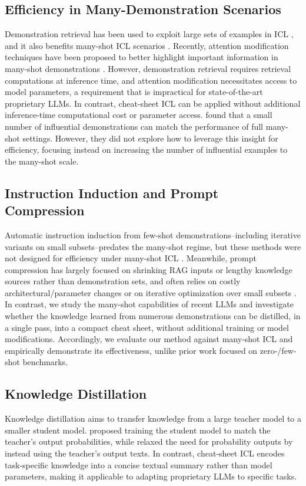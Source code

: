 \documentclass[11pt]{article}
\begin{document}
\subsection{Efficiency in Many-Demonstration Scenarios}
\label{sec:related_efficiency}
Demonstration retrieval has been used to exploit large sets of examples in ICL \citep{liu-etal-2022-makes,luo2024incontext}, and it also benefits many-shot ICL scenarios \citep{bertsch-etal-2025-context}.
Recently, attention modification techniques have been proposed to better highlight important information in many-shot demonstrations \citep{yuan-etal-2024-focused}.
However, demonstration retrieval requires retrieval computations at inference time, and attention modification necessitates access to model parameters, a requirement that is impractical for state-of-the-art proprietary LLMs.
In contrast, cheat-sheet ICL can be applied without additional inference-time computational cost or parameter access.
\citet{wan2025from} found that a small number of influential demonstrations can match the performance of full many-shot settings.
However, they did not explore how to leverage this insight for efficiency, focusing instead on increasing the number of influential examples to the many-shot scale.

\subsection{Instruction Induction and Prompt Compression}
\label{sec:related_inst}
Automatic instruction induction from few-shot demonstrations--including iterative variants on small subsets--predates the many-shot regime, but these methods were not designed for efficiency under many-shot ICL \citep{honovich-etal-2023-instruction,zhou2023large}.
Meanwhile, prompt compression has largely focused on shrinking RAG inputs or lengthy knowledge sources rather than demonstration sets, and often relies on costly architectural/parameter changes or on iterative optimization over small subsets \citep{li-etal-2025-prompt}.
In contrast, we study the many-shot capabilities of recent LLMs and investigate whether the knowledge learned from numerous demonstrations can be distilled, in a single pass, into a compact cheat sheet, without additional training or model modifications.
Accordingly, we evaluate our method against many-shot ICL and empirically demonstrate its effectiveness, unlike prior work focused on zero-/few-shot benchmarks.


\subsection{Knowledge Distillation}
\label{sec:distill}
Knowledge distillation aims to transfer knowledge from a large teacher model to a smaller student model.
\citet{hinton2015distilling} proposed training the student model to match the teacher's output probabilities, while \citet{west-etal-2022-symbolic} relaxed the need for probability outputs by instead using the teacher's output texts.
In contrast, cheat-sheet ICL encodes task-specific knowledge into a concise textual summary rather than model parameters, making it applicable to adapting proprietary LLMs to specific tasks.
\end{document}

